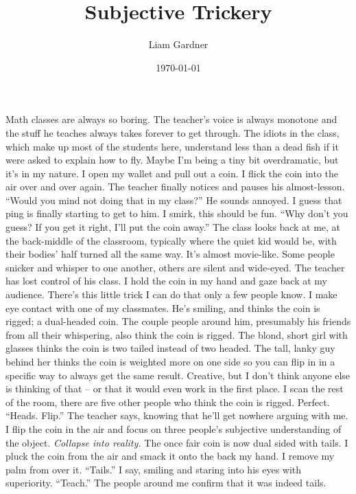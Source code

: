\documentclass[a4paper, 12pt]{book}
\title{Subjective Trickery}
\author{Liam Gardner}
\date{\today}
\begin{document}
\newcommand\tab[1][1cm]{\hspace*{#1}}
\maketitle
\tab
Math classes are always so boring. The teacher’s voice is always monotone and the stuff he teaches always takes forever to get through. The idiots in the class, which make up most of the students here, understand less than a dead fish if it were asked to explain how to fly. Maybe I’m being a tiny bit overdramatic, but it’s in my nature.
\newline
\tab
I open my wallet and pull out a coin. I flick the coin into the air over and over again. The teacher finally notices and pauses his almost-lesson. ``Would you mind not doing that in my class?'' He sounds annoyed. I guess that ping is finally starting to get to him. I smirk, this should be fun.
\newline
\tab
``Why don’t you guess? If you get it right, I’ll put the coin away.'' The class looks back at me, at the back-middle of the classroom, typically where the quiet kid would be, with their bodies’ half turned all the same way. It’s almost movie-like. Some people snicker and whisper to one another, others are silent and wide-eyed. The teacher has lost control of his class. I hold the coin in my hand and gaze back at my audience. There’s this little trick I can do that only a few people know. I make eye contact with one of my classmates. He’s smiling, and thinks the coin is rigged; a dual-headed coin. The couple people around him, presumably his friends from all their whispering, also think the coin is rigged. The blond, short girl with glasses thinks the coin is two tailed instead of two headed. The tall, lanky guy behind her thinks the coin is weighted more on one side so you can flip in in a specific way to always get the same result. Creative, but I don’t think anyone else is thinking of that -- or that it would even work in the first place. I scan the rest of the room, there are five other people who think the coin is rigged. Perfect.
\newline
\tab
``Heads. Flip.'' The teacher says, knowing that he’ll get nowhere arguing with me. I flip the coin in the air and focus on three people’s subjective understanding of the object.
\newline
\tab
\textit{Collapse into reality.}
\newline
\tab
The once fair coin is now dual sided with tails. I pluck the coin from the air and smack it onto the back my hand. I remove my palm from over it. ``Tails.'' I say, smiling and staring into his eyes with superiority. ``Teach.'' The people around me confirm that it was indeed tails.
\end{document}
